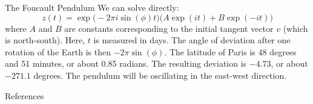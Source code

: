 \documentclass{beamer}
\begin{document}
    \begin{frame}{The Foucault Pendulum}
        We can solve directly:
        \begin{equation}
            z(t)=\exp\Big(-2\pi{i}\sin(\phi)t\Big)\Big(A\exp(it)+B\exp(-it)\Big)
        \end{equation}
        where $A$ and $B$ are constants corresponding to the initial tangent
        vector $v$ (which is north-south). Here, $t$ is measured in days. The
        angle of deviation after one rotation of the Earth is then
        $-2\pi\sin(\phi)$. The latitude of Paris is 48 degrees and 51 minutes,
        or about 0.85 radians. The resulting deviation is
        $-4.73$, or about $-271.1$ degrees. The pendulum will be oscillating
        in the east-west direction.
    \end{frame}
    \begin{frame}[allowframebreaks]{References}
        
        
    \end{frame}
\end{document}
